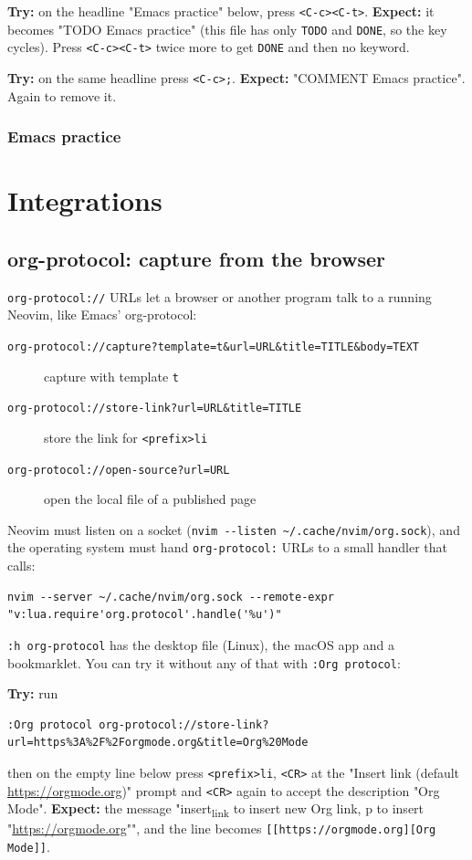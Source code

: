 \textbf{Try:} on the headline "Emacs practice" below, press \texttt{<C-c><C-t>}.
\textbf{Expect:} it becomes "TODO Emacs practice" (this file has only
\texttt{TODO} and \texttt{DONE}, so the key cycles). Press \texttt{<C-c><C-t>} twice more to
get \texttt{DONE} and then no keyword.

\textbf{Try:} on the same headline press \texttt{<C-c>;}.
\textbf{Expect:} "COMMENT Emacs practice". Again to remove it.
\subsubsection{Emacs practice}
\label{sec:org9999d85}
\section{Integrations}
\label{sec:org254b633}
\subsection{org-protocol: capture from the browser}
\label{sec:org543491e}
\texttt{org-protocol://} URLs let a browser or another program talk to a
running Neovim, like Emacs' org-protocol:

\begin{description}
\item[{\texttt{org-protocol://capture?template=t\&url=URL\&title=TITLE\&body=TEXT}}] capture with template \texttt{t}
\item[{\texttt{org-protocol://store-link?url=URL\&title=TITLE}}] store the link for \texttt{<prefix>li}
\item[{\texttt{org-protocol://open-source?url=URL}}] open the local file of a published page
\end{description}

Neovim must listen on a socket (\texttt{nvim -{}-{}listen \textasciitilde{}/.cache/nvim/org.sock}),
and the operating system must hand \texttt{org-protocol:} URLs to a small
handler that calls:

\begin{verbatim}
nvim --server ~/.cache/nvim/org.sock --remote-expr "v:lua.require'org.protocol'.handle('%u')"
\end{verbatim}

\texttt{:h org-protocol} has the desktop file (Linux), the macOS app and a
bookmarklet. You can try it without any of that with \texttt{:Org protocol}:

\textbf{Try:} run
\begin{verbatim}
:Org protocol org-protocol://store-link?url=https%3A%2F%2Forgmode.org&title=Org%20Mode
\end{verbatim}
then on the empty line below press \texttt{<prefix>li}, \texttt{<CR>} at the "Insert
link (default \url{https://orgmode.org})" prompt and \texttt{<CR>} again to accept the
description "Org Mode".
\textbf{Expect:} the message "insert\textsubscript{link} to insert new Org link, p to insert
"\url{https://orgmode.org}"", and the line becomes
\texttt{[[https://orgmode.org][Org Mode]]}.

